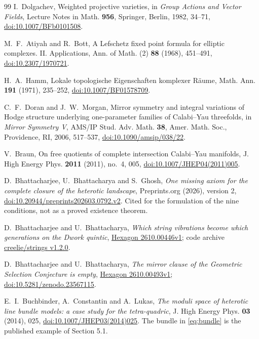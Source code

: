 \begin{thebibliography}{99}
I.~Dolgachev, Weighted projective varieties, in \emph{Group Actions and
Vector Fields}, Lecture Notes in Math. \textbf{956}, Springer, Berlin,
1982, 34--71,
\href{https://doi.org/10.1007/BFb0101508}{doi:10.1007/BFb0101508}.

M.~F.~Atiyah and R.~Bott, A Lefschetz fixed point formula for elliptic
complexes. II. Applications, Ann. of Math. (2) \textbf{88} (1968),
451--491,
\href{https://doi.org/10.2307/1970721}{doi:10.2307/1970721}.

H.~A.~Hamm, Lokale topologische Eigenschaften komplexer R\"aume, Math. Ann.
\textbf{191} (1971), 235--252,
\href{https://doi.org/10.1007/BF01578709}{doi:10.1007/BF01578709}.

C.~F.~Doran and J.~W.~Morgan, Mirror symmetry and integral variations of
Hodge structure underlying one-parameter families of Calabi--Yau
threefolds, in \emph{Mirror Symmetry V}, AMS/IP Stud. Adv. Math.
\textbf{38}, Amer. Math. Soc., Providence, RI, 2006, 517--537,
\href{https://doi.org/10.1090/amsip/038/22}{doi:10.1090/amsip/038/22}.

V.~Braun, On free quotients of complete intersection Calabi--Yau
manifolds, J. High Energy Phys. \textbf{2011} (2011), no.~4, 005,
\href{https://doi.org/10.1007/JHEP04(2011)005}{doi:10.1007/JHEP04(2011)005}.

D.~Bhattacharjee, U.~Bhattacharya and S.~Ghosh,
\emph{One missing axiom for the complete closure of the heterotic landscape},
Preprints.org (2026), version 2,
\href{https://doi.org/10.20944/preprints202603.0792.v2}{doi:10.20944/preprints202603.0792.v2}.
Cited for the formulation of the nine conditions, not as a proved
existence theorem.

D.~Bhattacharjee and U.~Bhattacharya,
\emph{Which string vibrations become which generations on the Dwork quintic},
\href{https://hexagonmath.org/2610.00446v1}{Hexagon 2610.00446v1};
code archive \href{https://github.com/creelie/strings/releases/tag/v1.2.0}{creelie/strings v1.2.0}.

D.~Bhattacharjee and U.~Bhattacharya,
\emph{The mirror clause of the Geometric Selection Conjecture is empty},
\href{https://hexagonmath.org/2610.00493v1}{Hexagon 2610.00493v1};
\href{https://doi.org/10.5281/zenodo.23567115}{doi:10.5281/zenodo.23567115}.

E.~I.~Buchbinder, A.~Constantin and A.~Lukas,
\emph{The moduli space of heterotic line bundle models: a case study for the
tetra-quadric}, J. High Energy Phys. \textbf{03} (2014), 025,
\href{https://doi.org/10.1007/JHEP03(2014)025}{doi:10.1007/JHEP03(2014)025}.
The bundle in \eqref{eq:bundle} is the published example of Section 5.1.


\end{thebibliography}
